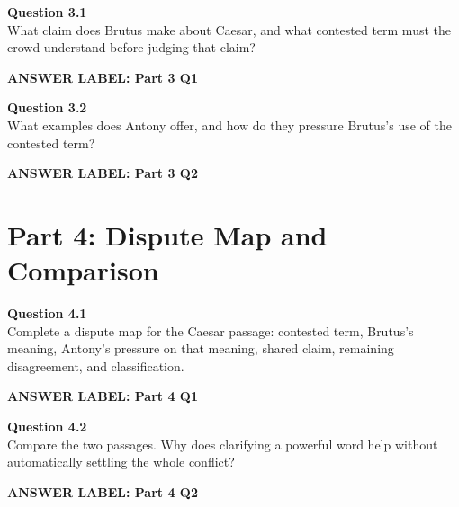 \documentclass[12pt]{article}
\newcommand{\answerbox}[2]{%
\vspace{0.12em}
\noindent\textbf{#1}\par
\vspace{0.04em}
\noindent\fbox{%
\begin{minipage}[t][#2]{\dimexpr\textwidth-2\fboxsep-2\fboxrule}
\rule{\textwidth}{0pt}
\vspace{#2}
\end{minipage}}
\par\vspace{0.22em}}
\begin{document}
\textbf{Question 3.1}\\[-0.15em]
What claim does Brutus make about Caesar, and what contested term must the crowd understand before judging that claim?

\answerbox{ANSWER LABEL: Part 3 Q1}{2.35in}

\textbf{Question 3.2}\\[-0.15em]
What examples does Antony offer, and how do they pressure Brutus's use of the contested term?

\answerbox{ANSWER LABEL: Part 3 Q2}{2.5in}

\newpage

\section*{Part 4: Dispute Map and Comparison}

\textbf{Question 4.1}\\[-0.15em]
Complete a dispute map for the Caesar passage: contested term, Brutus's meaning, Antony's pressure on that meaning, shared claim, remaining disagreement, and classification.

\answerbox{ANSWER LABEL: Part 4 Q1}{2.75in}

\textbf{Question 4.2}\\[-0.15em]
Compare the two passages. Why does clarifying a powerful word help without automatically settling the whole conflict?

\answerbox{ANSWER LABEL: Part 4 Q2}{2.5in}
\end{document}
